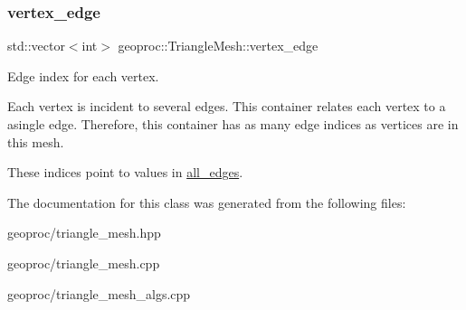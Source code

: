 \subsubsection{\texorpdfstring{vertex\+\_\+edge}{vertex\_edge}}
{\footnotesize\ttfamily std\+::vector$<$int$>$ geoproc\+::\+Triangle\+Mesh\+::vertex\+\_\+edge\hspace{0.3cm}{\ttfamily [protected]}}



Edge index for each vertex. 

Each vertex is incident to several edges. This container relates each vertex to a asingle edge. Therefore, this container has as many edge indices as vertices are in this mesh.

These indices point to values in \hyperlink{classgeoproc_1_1TriangleMesh_ab10f052ad932cd78056a55b58ddd475c}{all\+\_\+edges}. 

The documentation for this class was generated from the following files\+:\begin{DoxyCompactItemize}
\item 
geoproc/triangle\+\_\+mesh.\+hpp\item 
geoproc/triangle\+\_\+mesh.\+cpp\item 
geoproc/triangle\+\_\+mesh\+\_\+algs.\+cpp\end{DoxyCompactItemize}
